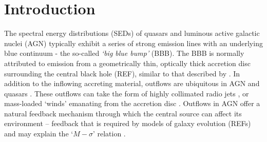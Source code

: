 \documentclass[preprint, a4paper, 11pt]{aastex}
\begin{document}
\maketitle



%
%

\section{Introduction}


The spectral energy distributions (SEDs) of 
quasars and luminous active galactic nuclei (AGN) 
typically exhibit a series of strong emission lines
with an underlying blue continuum - the so-called {\sl `big blue bump'} (BBB). 
The BBB is normally attributed to emission from a geometrically thin, 
optically thick accretion disc surrounding the central black hole (REF), similar
to that described by \cite{shakurasunyaev1973}.
In addition to the inflowing accreting material, 
outflows are ubiquitous in AGN
and quasars \citep{kellerman1989,ganguly2008}. These outflows can take the form of 
highly collimated radio jets \citep[e.g.][]{hazard1963,potash1980,perley1984,marscher2006}, 
or mass-loaded `winds' emanating from the accretion disc 
\citep{weymann1991,turnermiller2009}. 
Outflows in AGN offer a 
natural feedback mechanism through which the central source can 
affect its environment \citep{king2003,king2005,fabian2012}
-- feedback that is required by models of galaxy evolution (REFs) 
and may explain the `$M-\sigma$' relation \citep{silkrees1998,haring2004}.
\end{document}
